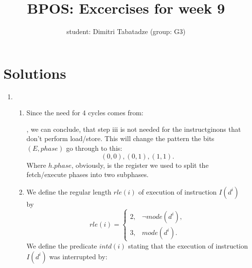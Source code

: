 \documentclass{article}
\title{BPOS: Excercises for week 9}
\author{student: Dimitri Tabatadze (group: G3)}
\begin{document}
    \maketitle

    \section*{Solutions}

    \begin{enumerate}
        \item {
			\begin{enumerate}
				\item {
                    Since the need for 4 cycles comes from: 
                    ,
                    we can conclude, that step iii is not needed for the instructginons that don't perform load/store. This will change the pattern the bits $(E, phase)$ go through to this:
                    \begin{displaymath}
                        (0, 0), (0, 1), (1, 1).
                    \end{displaymath}
                    Where $h.phase$, obviously, is the register we used to split the fetch/execute phases into two subphases.
                }
                \item {
                    We define the regular length $rle(i)$ of execution of
                    instruction $I(d^i)$ by
                    \begin{displaymath}
                        rle(i) = \begin{cases}
                            2, & \lnot mode(d^i), \\
                            3, & mode(d^i).
                        \end{cases}
                    \end{displaymath}
                    We define the predicate $intd(i)$ stating that the execution of instruction $I(d^i)$ was interrupted by:
                    \begin{displaymath}

\end{displaymath}}
\end{enumerate}}
\end{enumerate}
\end{document}

